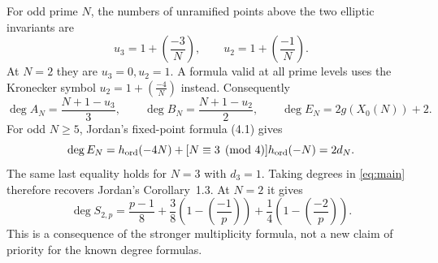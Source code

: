 For odd prime $N$, the numbers of unramified points above the two elliptic invariants are
\[
 u_3=1+\left(\frac{-3}{N}\right),\qquad
 u_2=1+\left(\frac{-1}{N}\right).
\]
At $N=2$ they are $u_3=0,u_2=1$. A formula valid at all prime levels uses the Kronecker symbol $u_2=1+\left(\frac{-4}{N}\right)$ instead. Consequently
\[
 \deg A_N=\frac{N+1-u_3}{3},\qquad
 \deg B_N=\frac{N+1-u_2}{2},\qquad
 \deg E_N=2g(X_0(N))+2.
\]
For odd $N\ge5$, Jordan's fixed-point formula (4.1) gives
\[
 \deg E_N=h_{\rm ord}(-4N)+[N\equiv3\pmod4]h_{\rm ord}(-N)=2d_N.
\]
The same last equality holds for $N=3$ with $d_3=1$. Taking degrees in \eqref{eq:main} therefore recovers Jordan's Corollary~1.3. At $N=2$ it gives
\[
 \deg S_{2,p}=\frac{p-1}{8}+\frac38\left(1-\left(\frac{-1}{p}\right)\right)
                       +\frac14\left(1-\left(\frac{-2}{p}\right)\right).
\]
This is a consequence of the stronger multiplicity formula, not a new claim of priority for the known degree formulas.
